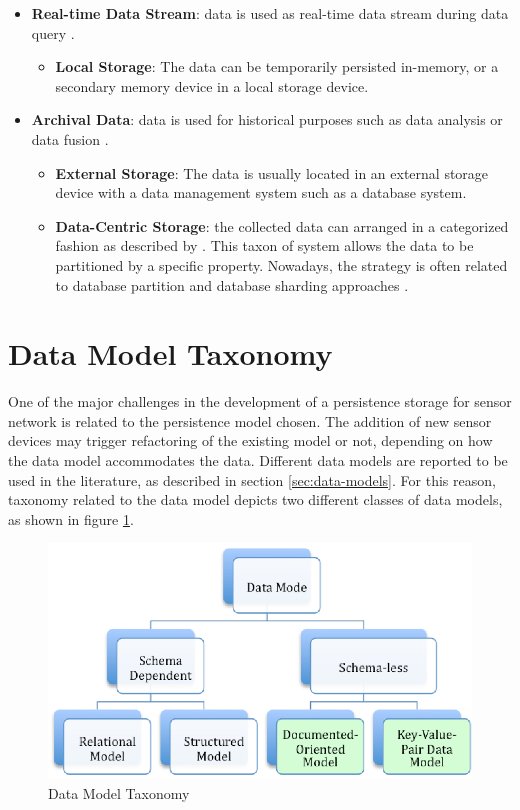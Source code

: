 \begin{itemize}
  \item \textbf{Real-time Data Stream}: data is used as real-time data stream
  during data query \cite{sn-intro01}.
    \begin{itemize}[label=\textbullet]
        \item \textbf{Local Storage}: The data can be temporarily persisted
        in-memory, or a secondary memory device in a local storage device.
    \end{itemize}
  \item \textbf{Archival Data}: data is used for historical purposes such as
  data analysis or data fusion \cite{sn-intro01, sn-intro02}.  
    \begin{itemize}[label=\textbullet]
      \item \textbf{External Storage}: The data is usually located in an
       external storage device with a data management system such as a database
       system.
      \item \textbf{Data-Centric Storage}: the collected data can arranged in a
      categorized fashion as described by \cite{sn-storage03}. This taxon of
      system allows the data to be partitioned by a specific property. Nowadays,
      the strategy is often related to database partition \cite{db-partition}
      and database sharding approaches \cite{db-shard01} \cite{db-shard02}.
    \end{itemize}
\end{itemize}

\section{Data Model Taxonomy}

One of the major challenges in the development of a persistence storage for
sensor network is related to the persistence model chosen. The addition of new
sensor devices may trigger refactoring of the existing model or not, depending
on how the data model accommodates the data. Different data models are reported
to be used in the literature, as described in section \ref{sec:data-models}.
For this reason, taxonomy related to the data model depicts two different
classes of data models, as shown in figure \ref{fig:taxonomy-data-model}.

\begin{figure}[h]
  \centering
  \includegraphics{../diagrams/taxonomy-data-model}
  \caption{Data Model Taxonomy}
  \label{fig:taxonomy-data-model}
\end{figure}


